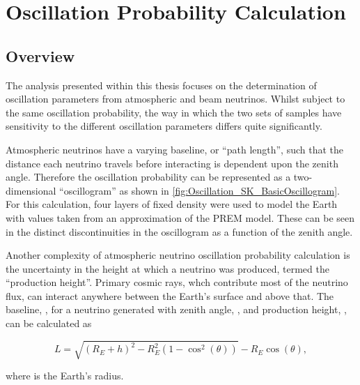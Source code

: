 \chapter{Oscillation Probability Calculation}
\label{chap:OscillationProbability}

\section{Overview}
\label{sec:Oscillation_Overview}

The analysis presented within this thesis focuses on the determination of oscillation parameters from atmospheric and beam neutrinos. Whilst subject to the same oscillation probability, the way in which the two sets of samples have sensitivity to the different oscillation parameters differs quite significantly.

Atmospheric neutrinos have a varying baseline, or ``path length'', such that the distance each neutrino travels before interacting is dependent upon the zenith angle. Therefore the oscillation probability can be represented as a two-dimensional ``oscillogram'' as shown in \autoref{fig:Oscillation_SK_BasicOscillogram}. For this calculation, four layers of fixed density were used to model the Earth with values taken from an approximation of the PREM model. These can be seen in the distinct discontinuities in the oscillogram as a function of the zenith angle.

Another complexity of atmospheric neutrino oscillation probability calculation is the uncertainty in the height at which a neutrino was produced, termed the ``production height''. Primary cosmic rays, whch contribute most of the neutrino flux, can interact anywhere between the Earth's surface and  above that. The baseline, , for a neutrino generated with zenith angle, \quickmath{\theta}, and production height, , can be calculated as

\begin{equation}
  L = \sqrt{\left(R_{E} + h\right)^{2} - R_{E}^{2} \left(1 - \cos^{2} \left(\theta \right) \right)} - R_{E}\cos(\theta),
\end{equation}

where  is the Earth's radius.

